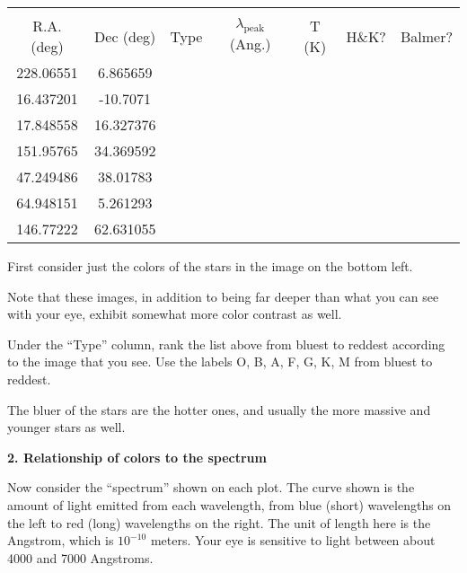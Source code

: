 \begin{center}
\begin{tabular}{ccccccc} \hline \\ [-6pt]
R.A. (deg)  & Dec (deg)  & \hspace{0.2cm} Type \hspace{0.2cm} 
& \hspace{0.2cm} $\lambda_{\mathrm{peak}}$ (Ang.) \hspace{0.2cm} 
& \hspace{0.2cm} T (K) \hspace{0.2cm} 
& \hspace{0.2cm} H\&K? \hspace{0.2cm} 
& \hspace{0.2cm} Balmer?  \hspace{0.2cm} 
\\ [6pt]
\hline
228.06551 &  6.865659 & & & & &    \\ \hline
16.437201 &  -10.7071  & & & & &   \\ \hline
17.848558 &  16.327376 & & & & &    \\ \hline
151.95765 &  34.369592 & & & & &    \\ \hline
47.249486 &  38.01783  & & & & &   \\ \hline
64.948151 &  5.261293  & & & & &   \\ \hline
146.77222 &  62.631055 & & & & &    \\ \hline
\end{tabular}
\end{center}

\noindent First consider just the colors of the stars in the image on
the bottom left.  

\noindent Note that these images, in addition to
being far deeper than what you can see with your eye, exhibit somewhat
more color contrast as well.

\noindent Under the ``Type'' column, rank the list above from bluest
to reddest according to the image that you see. Use the labels O, B,
A, F, G, K, M from bluest to reddest.

\noindent The bluer of the stars are the hotter ones, and usually the
more massive and younger stars as well.  

\noindent
{\bf 2. Relationship of colors to the spectrum}

\noindent Now consider the ``spectrum'' shown on each plot.  The
curve shown is the amount of light emitted from each wavelength, from
blue (short) wavelengths on the left to red (long) wavelengths on the
right.  The unit of length here is the Angstrom, which is $10^{-10}$
meters. Your eye is sensitive to light between about 4000 and 7000
Angstroms.

